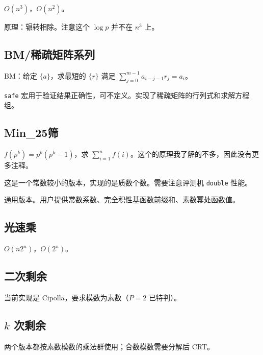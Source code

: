 \documentclass[12pt]{ctexart}
\begin{document}
$O(n^3)$，$O(n^2)$。

原理：辗转相除。注意这个 $\log p$ 并不在 $n^3$ 上。



\subsection{BM/稀疏矩阵系列}

BM：给定 $\{a\}$，求最短的 $\{r\}$ 满足 $\sum\limits_{j=0}^{m-1} a_{i-j-1}r_j=a_i$。

\verb|safe| 宏用于验证结果正确性，可不定义。实现了稀疏矩阵的行列式和求解方程组。





\subsection{Min\_25筛}

$f(p^k)=p^k(p^k-1)$，求 $\sum\limits_{i=1}^n f(i)$。这个的原理我了解的不多，因此没有更多注释。



这是一个常数较小的版本，实现的是质数个数。需要注意评测机 \verb|double| 性能。



通用版本。用户提供常数系数、完全积性基函数前缀和、素数幂处函数值。



\subsection{光速乘}

$O(n2^n)$，$O(2^n)$。




\subsection{二次剩余}

当前实现是 Cipolla，要求模数为素数（$P=2$ 已特判）。


\subsection{$k$ 次剩余}
两个版本都按素数模数的乘法群使用；合数模数需要分解后 CRT。

\end{document}
